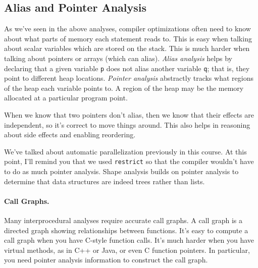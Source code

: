 \subsection*{Alias and Pointer Analysis}
As we've seen in the above analyses, compiler optimizations often need
to know about what parts of memory each statement reads to.  This is
easy when talking about scalar variables which are stored on the
stack. This is much harder when talking about pointers or arrays
(which can alias). \emph{Alias analysis} helps by declaring that a
given variable {\tt p} does not alias another variable {\tt q}; that
is, they point to different heap locations. \emph{Pointer analysis}
abstractly tracks what regions of the heap each variable points to.
A region of the heap may be the memory allocated at a particular
program point.

When we know that two pointers don't alias, then we know that their
effects are independent, so it's correct to move things around.
This also helps in reasoning about side effects and enabling reordering.

We've talked about automatic parallelization previously in this course.
At this point, I'll remind you that we used {\tt restrict} so that the
compiler wouldn't have to do as much pointer analysis. Shape analysis
builds on pointer analysis to determine that data structures are indeed
trees rather than lists.

\paragraph{Call Graphs.} Many interprocedural analyses require accurate
call graphs. A call graph is a directed graph showing relationships between
functions. It's easy to compute a call graph when you have C-style
function calls. It's much harder when you have virtual methods, as in
C++ or Java, or even C function pointers. In particular, you need pointer
analysis information to construct the call graph.

